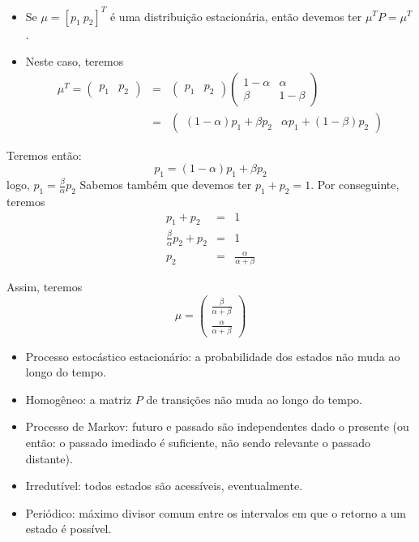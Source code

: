 \begin{frame}[allowframebreaks]
\begin{example}
     \begin{itemize}
     \item Se $\mu = [p_1 \ p_2]^T$ é uma distribuição estacionária, então devemos ter $\mu^T P = \mu^T$.
     \item Neste caso, teremos
	\begin{eqnarray}
	\mu^T = \begin{pmatrix} p_1 & p_2 \end{pmatrix} &=& \begin{pmatrix} p_1 & p_2 \end{pmatrix} \begin{pmatrix} 1 - \alpha & \alpha \\ \beta & 1 - \beta \end{pmatrix} \nonumber \\
		&=& \begin{pmatrix} (1-\alpha) p_1 + \beta p_2 & \alpha p_1 + (1-\beta) p_2 \end{pmatrix}
	\end{eqnarray}
     \end{itemize}

	\examplebreak

	Teremos então:
	\begin{equation}
	p_1 = (1-\alpha) p_1 + \beta p_2
	\end{equation}
	logo, $p_1 = \frac{\beta}{\alpha} p_2$
	Sabemos também que devemos ter $p_1 + p_2 = 1$. Por conseguinte, teremos
	\begin{eqnarray}
	p_1 + p_2 &=& 1 \nonumber \\
	\frac{\beta}{\alpha} p_2 + p_2 &=& 1 \nonumber \\
	p_2 &=& \frac{\alpha}{\alpha + \beta}
	\end{eqnarray}

	\examplebreak

	Assim, teremos
	\begin{equation}
	\mu = \begin{pmatrix} \frac{\beta}{\alpha + \beta} \\ \frac{\alpha}{\alpha + \beta} \end{pmatrix}
	\end{equation}
   \end{example}

   \framebreak

   \begin{itemize}
   \item Processo estocástico estacionário: a probabilidade dos estados não muda ao longo do tempo.
   \item Homogêneo: a matriz $P$ de transições não muda ao longo do tempo.
   \item Processo de Markov: futuro e passado são independentes dado o presente (ou então: o passado imediado é suficiente, 
	não sendo relevante o passado distante).
   \item Irredutível: todos estados são acessíveis, eventualmente.
   \item Periódico: máximo divisor comum entre os intervalos em que o retorno a um estado é possível.
   \end{itemize}


\end{frame}
